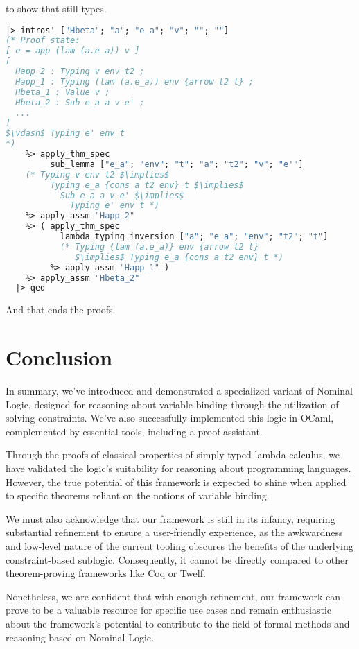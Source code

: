 \documentclass[english, mgr]{iithesis}
\newcommand{\lstt}[1]{\text{{\lstinline[columns=fixed,mathescape]|#1|}}}
\begin{document}
\lstt{sub\_lemma} to show that \lstt{e'} still types.
\begin{lstlisting}[mathescape,language=OCaml,escapebegin=\color{codegreen}]
  |> intros' ["Hbeta"; "a"; "e_a"; "v"; ""; ""]
(* Proof state:
[ e = app (lam (a.e_a)) v ]
[
  Happ_2 : Typing v env t2 ;
  Happ_1 : Typing (lam (a.e_a)) env {arrow t2 t} ;
  Hbeta_1 : Value v ;
  Hbeta_2 : Sub e_a a v e' ;
  ...
]
$\vdash$ Typing e' env t
*)
    %> apply_thm_spec
         sub_lemma ["e_a"; "env"; "t"; "a"; "t2"; "v"; "e'"]
    (* Typing v env t2 $\implies$
         Typing e_a {cons a t2 env} t $\implies$
           Sub e_a a v e' $\implies$
             Typing e' env t *)
    %> apply_assm "Happ_2"
    %> ( apply_thm_spec
           lambda_typing_inversion ["a"; "e_a"; "env"; "t2"; "t"]
           (* Typing {lam (a.e_a)} env {arrow t2 t}
              $\implies$ Typing e_a {cons a t2 env} t *)
         %> apply_assm "Happ_1" )
    %> apply_assm "Hbeta_2"
  |> qed
\end{lstlisting}
And that ends the proofs.
\chapter{Conclusion}
In summary, we've introduced and demonstrated a specialized variant of Nominal Logic,
designed for reasoning about variable binding
through the utilization of solving constraints.
We've also successfully implemented this logic in OCaml,
complemented by essential tools, including a proof assistant.

Through the proofs of classical properties of simply typed lambda calculus,
we have validated the logic's suitability for reasoning about programming languages.
However, the true potential of this framework is expected to shine when applied to
specific theorems reliant on the notions of variable binding.

We must also acknowledge that our framework is still in its infancy,
requiring substantial refinement to ensure a user-friendly experience, as the
awkwardness and low-level nature of the current tooling obscures the benefits
of the underlying constraint-based sublogic.
Consequently, it cannot be directly compared to other theorem-proving frameworks
like Coq or Twelf.

Nonetheless, we are confident that with enough refinement,
our framework can prove to be a valuable resource for specific use cases and
remain enthusiastic about the framework's potential to
contribute to the field of formal methods and reasoning based on Nominal Logic.
\end{document}
